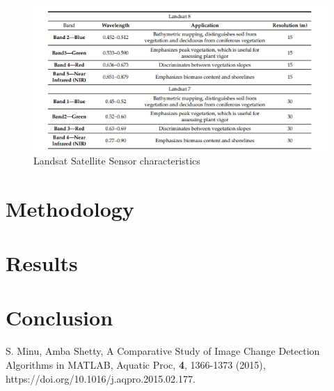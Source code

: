 \documentclass[12pt,a4paper]{article}
\begin{document}
\begin{figure}[h]
	\centering
	\includegraphics[width=0.7\linewidth]{./wavelength-9.png}
	\caption{Landsat Satellite Sensor characteristics}
	\label{fig:wavelength}
\end{figure}

\section{Methodology}

\section{Results}

\section{Conclusion}

\begin{thebibliography}{99}

 S. Minu, 
Amba Shetty,
{A Comparative Study of Image Change Detection Algorithms in MATLAB},
Aquatic Proc, {\bf 4}, 1366-1373 (2015), https://doi.org/10.1016/j.aqpro.2015.02.177.
\end{thebibliography}
\end{document}
